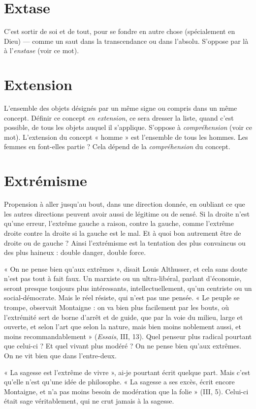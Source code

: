 \section{Extase}
C’est sortir de soi et de tout, pour se fondre en autre chose (spécialement
en Dieu) — comme un saut dans la transcendance ou
dans l’absolu. S’oppose par là à l’{\it enstase} (voir ce mot).

\section{Extension}
L'ensemble des objets désignés par un même signe ou compris
dans un même concept. Définir ce concept {\it en extension},
ce sera dresser la liste, quand c’est possible, de tous les objets auquel il
s'applique. S’oppose à {\it compréhension} (voir ce mot). L'extension du concept
« homme » est l’ensemble de tous les hommes. Les femmes en font-elles partie ?
Cela dépend de la {\it compréhension} du concept.

\section{Extrémisme}
Propension à aller jusqu’au bout, dans une direction donnée,
en oubliant ce que les autres directions peuvent avoir
aussi de légitime ou de sensé. Si la droite n’est qu’une erreur, l'extrême gauche
a raison, contre la gauche, comme l'extrême droite contre la droite si la gauche
est le mal. Et à quoi bon autrement être de droite ou de gauche ? Ainsi l’extrémisme
est la tentation des plus convaincus ou des plus haineux : double
danger, double force.

« On ne pense bien qu'aux extrêmes », disait Louis Althusser, et cela sans
doute n’est pas tout à fait faux. Un marxiste ou un ultra-libéral, parlant d’économie,
seront presque toujours plus intéressants, intellectuellement, qu’un centriste
ou un social-démocrate. Mais le réel résiste, qui n’est pas une pensée. « Le
peuple se trompe, observait Montaigne : on va bien plus facilement par les
bouts, où l’extrémité sert de borne d’arrêt et de guide, que par la voie du
milieu, large et ouverte, et selon l’art que selon la nature, mais bien moins
noblement aussi, et moins recommandablement » ({\it Essais}, III, 13). Quel penseur
plus radical pourtant que celui-ci ? Et quel vivant plus modéré ? On ne
pense bien qu'aux extrêmes. On ne vit bien que dans l’entre-deux.

« La sagesse est l’extrême de vivre », ai-je pourtant écrit quelque part. Mais
c'est qu’elle n’est qu’une idée de philosophe. « La sagesse a ses excès, écrit
encore Montaigne, et n’a pas moins besoin de modération que la folie » (III, 5).
Celui-ci était sage véritablement, qui ne crut jamais à la sagesse.

